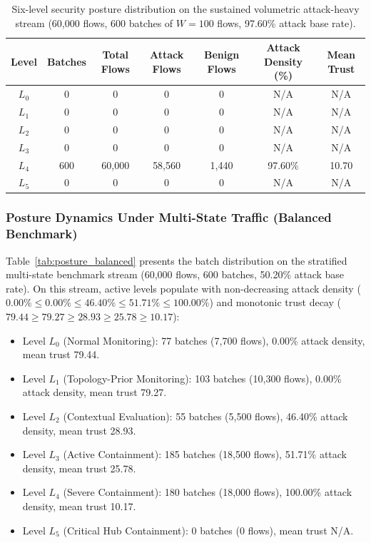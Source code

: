 \documentclass[journal,10pt,onecolumn]{IEEEtran}
\begin{document}
\begin{table}[t]
\caption{Six-level security posture distribution on the sustained volumetric attack-heavy stream (60,000 flows, 600 batches of $W=100$ flows, 97.60\% attack base rate).}
\label{tab:posture_attack_heavy}
\centering
\small
\begin{tabular}{ccccccc}
\toprule
\textbf{Level} & \textbf{Batches} & \textbf{Total Flows} & \textbf{Attack Flows} & \textbf{Benign Flows} & \textbf{Attack Density (\%)} & \textbf{Mean Trust} \\
\midrule
$L_0$ & 0 & 0 & 0 & 0 & N/A & N/A \\
$L_1$ & 0 & 0 & 0 & 0 & N/A & N/A \\
$L_2$ & 0 & 0 & 0 & 0 & N/A & N/A \\
$L_3$ & 0 & 0 & 0 & 0 & N/A & N/A \\
$L_4$ & 600 & 60,000 & 58,560 & 1,440 & 97.60\% & 10.70 \\
$L_5$ & 0 & 0 & 0 & 0 & N/A & N/A \\
\bottomrule
\end{tabular}
\end{table}

\subsubsection{Posture Dynamics Under Multi-State Traffic (Balanced Benchmark)}
Table~\ref{tab:posture_balanced} presents the batch distribution on the stratified multi-state benchmark stream (60,000 flows, 600 batches, 50.20\% attack base rate). On this stream, active levels populate with non-decreasing attack density ($0.00\% \le 0.00\% \le 46.40\% \le 51.71\% \le 100.00\%$) and monotonic trust decay ($79.44 \ge 79.27 \ge 28.93 \ge 25.78 \ge 10.17$):
\begin{itemize}
    \item Level $L_0$ (Normal Monitoring): 77 batches (7,700 flows), 0.00\% attack density, mean trust 79.44.
    \item Level $L_1$ (Topology-Prior Monitoring): 103 batches (10,300 flows), 0.00\% attack density, mean trust 79.27.
    \item Level $L_2$ (Contextual Evaluation): 55 batches (5,500 flows), 46.40\% attack density, mean trust 28.93.
    \item Level $L_3$ (Active Containment): 185 batches (18,500 flows), 51.71\% attack density, mean trust 25.78.
    \item Level $L_4$ (Severe Containment): 180 batches (18,000 flows), 100.00\% attack density, mean trust 10.17.
    \item Level $L_5$ (Critical Hub Containment): 0 batches (0 flows), mean trust N/A.
\end{itemize}
\end{document}
